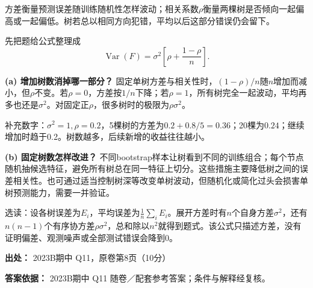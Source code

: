方差衡量预测误差随训练随机性怎样波动；相关系数\(\rho\)衡量两棵树是否倾向一起偏高或一起偏低。树若总以相同方向犯错，平均以后这部分错误仍会留下。


先把题给公式整理成
\[
\operatorname{Var}(F)=\sigma^2\left[\rho+\frac{1-\rho}{n}\right].
\]


\textbf{(a) 增加树数消掉哪一部分？} 固定单树方差与相关性时，\((1-\rho)/n\)随\(n\)增加而减小，但\(\rho\)不变。若\(\rho=0\)，方差按\(1/n\)下降；若\(\rho=1\)，所有树完全一起波动，平均再多也还是\(\sigma^2\)。对固定正\(\rho\)，很多树时的极限为\(\rho\sigma^2\)。


补充数字：\(\sigma^2=1,\rho=0.2\)，5棵树的方差为\(0.2+0.8/5=0.36\)；20棵为\(0.24\)；继续增加时趋于0.2。树数越多，后续新增的收益往往越小。


\textbf{(b) 固定树数怎样改进？} 不同bootstrap样本让树看到不同的训练组合；每个节点随机抽候选特征，避免所有树总在同一特征上切分。这些措施主要降低树之间的误差相关性。也可通过适当控制树深等改变单树波动，但随机化或简化过头会损害单树预测能力，需要一并验证。


选读：设各树误差为\(E_i\)，平均误差为\(\frac1n\sum_iE_i\)。展开方差时有\(n\)个自身方差\(\sigma^2\)，还有\(n(n-1)\)个有序协方差\(\rho\sigma^2\)，总和除以\(n^2\)就得到题式。该公式只描述方差，没有证明偏差、观测噪声或全部测试错误会降到0。


\textbf{出处：} 2023B期中 Q11，原卷第8页（10分）


\textbf{答案依据：} 2023B期中 Q11 随卷／配套参考答案；条件与解释经复核。
